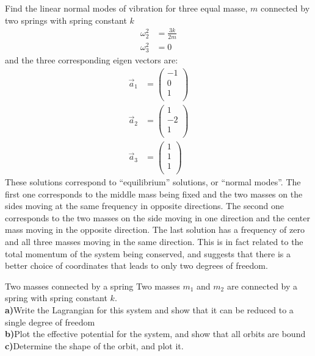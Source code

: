 \begin{example}{0pt}{Find the linear normal modes of vibration for three equal masse, $m$ connected by two springs with spring constant $k$}{}
\begin{align*}
\omega_2^2&=\frac{3k}{2m}\\
\omega_3^2&=0
\end{align*}
and the three corresponding eigen vectors are:
\begin{align*}
\vec{a}_1&=\left(\begin{array}{c}
-1 \\0 \\1\\
\end{array} \right)\nonumber\\
\vec{a}_2&=\left(\begin{array}{c}
1 \\ -2 \\1\\
\end{array} \right)\nonumber\\
\vec{a}_3&=\left(\begin{array}{c}
1 \\ 1 \\1\\
\end{array} \right)
\end{align*}
These solutions correspond to ``equilibrium'' solutions, or ``normal modes''. The first one corresponds to the middle mass being fixed and the two masses on the sides moving at the same frequency in opposite directions. The second one corresponds to the two masses on the side moving in one direction and the center mass moving in the opposite direction. The last solution has a frequency of zero and all three masses moving in the same direction. This is in fact related to the total momentum of the system being conserved, and suggests that there is a better choice of coordinates that leads to only two degrees of freedom.


\label{ex:threecoupledoscillators}
\end{example}


\begin{problem}{Two masses connected by a spring}
Two masses $m_1$ and $m_2$ are connected by a spring with spring constant $k$.\\
\textbf{a)}Write the Lagrangian for this system and show that it can be reduced to a single degree of freedom\\
\textbf{b)}Plot the effective potential for the system, and show that all orbits are bound\\
\textbf{c)}Determine the shape of the orbit, and plot it.
\end{problem}

